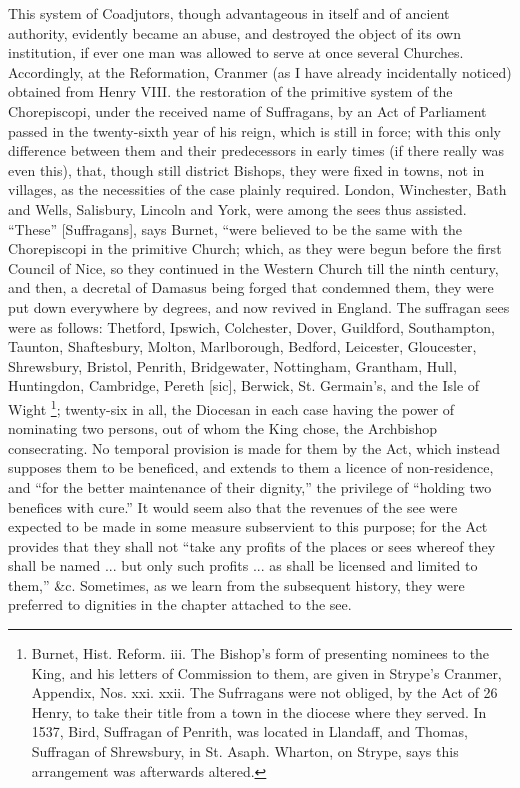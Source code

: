 This system of Coadjutors, though advantageous in
itself and of ancient authority, evidently became an abuse, and
destroyed the object of its own institution, if ever one man was
allowed to serve at once several Churches. Accordingly, at the
Reformation, Cranmer (as I have already incidentally noticed) obtained
from Henry VIII. the restoration of the primitive system of the
Chorepiscopi, under the received name of Suffragans, by an Act of
Parliament passed in the twenty-sixth year of his reign, which is
still in force; with this only difference between them and their
predecessors in early times (if there really was even this), that,
though still district Bishops, they were fixed in towns, not in
villages, as the necessities of the case plainly required. London,
Winchester, Bath and Wells, Salisbury, Lincoln and York, were
among the sees thus assisted. ``These'' [Suffragans], says Burnet, ``were
believed to be the same with the Chorepiscopi in the primitive Church;
which, as they were begun before the first Council of Nice, so they
continued in the Western Church till the ninth century, and then, a
decretal of Damasus being forged that condemned them, they were put
down everywhere by degrees, and now revived in England. The suffragan
sees were as follows: Thetford, Ipswich, Colchester, Dover, Guildford,
Southampton, Taunton, Shaftesbury, Molton, Marlborough, Bedford,
Leicester, Gloucester, Shrewsbury, Bristol, Penrith, Bridgewater,
Nottingham, Grantham, Hull, Huntingdon, Cambridge, Pereth [sic],
Berwick, St. Germain's, and the Isle of Wight \footnote{Burnet, Hist. Reform. iii. The Bishop's form of presenting nominees to
the King, and his letters of Commission to them, are given in Strype's
Cranmer, Appendix, Nos. xxi. xxii. The Sufrragans were not obliged, by
the Act of 26 Henry, to take their title from a town in the diocese
where they served. In 1537, Bird, Suffragan of Penrith, was located in
Llandaff, and Thomas, Suffragan of Shrewsbury, in St. Asaph. Wharton,
on Strype, says this arrangement was afterwards altered.}; twenty-six in all, the Diocesan in each case having the power
of nominating two persons, out of whom the King chose, the Archbishop
consecrating. No temporal provision is made for them by the Act, which
instead supposes them to be beneficed, and extends to them a licence
of non-residence, and ``for the better maintenance of their dignity,''
the privilege of ``holding two benefices with cure.'' It would seem also
that the revenues of the see were expected to be made in some measure
subservient to this purpose; for the Act provides that they shall not ``take
any profits of the places or sees whereof they shall be named ... but
only such profits ... as shall be licensed and limited to them,''
\&c. Sometimes, as we learn from the subsequent history, they were
preferred to dignities in the chapter attached to the see.


